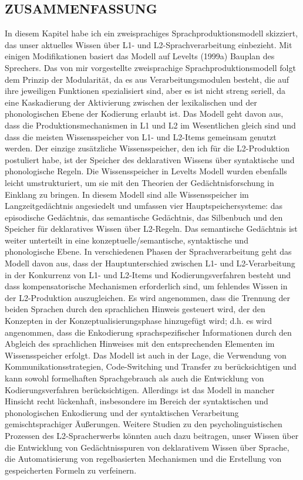 \documentclass[
  letterpaper,
]{scrbook}
\begin{document}
\hypertarget{zusammenfassung}{%
\subsection{ZUSAMMENFASSUNG}\label{zusammenfassung}}

In diesem Kapitel habe ich ein zweisprachiges Sprachproduktionsmodell
skizziert, das unser aktuelles Wissen über L1- und L2-Sprachverarbeitung
einbezieht. Mit einigen Modifikationen basiert das Modell auf Levelts
(1999a) Bauplan des Sprechers. Das von mir vorgestellte zweisprachige
Sprachproduktionsmodell folgt dem Prinzip der Modularität, da es aus
Verarbeitungsmodulen besteht, die auf ihre jeweiligen Funktionen
spezialisiert sind, aber es ist nicht streng seriell, da eine
Kaskadierung der Aktivierung zwischen der lexikalischen und der
phonologischen Ebene der Kodierung erlaubt ist. Das Modell geht davon
aus, dass die Produktionsmechanismen in L1 und L2 im Wesentlichen gleich
sind und dass die meisten Wissensspeicher von L1- und L2-Items gemeinsam
genutzt werden. Der einzige zusätzliche Wissensspeicher, den ich für die
L2-Produktion postuliert habe, ist der Speicher des deklarativen Wissens
über syntaktische und phonologische Regeln. Die Wissensspeicher in
Levelts Modell wurden ebenfalls leicht umstrukturiert, um sie mit den
Theorien der Gedächtnisforschung in Einklang zu bringen. In diesem
Modell sind alle Wissensspeicher im Langzeitgedächtnis angesiedelt und
umfassen vier Hauptspeichersysteme: das episodische Gedächtnis, das
semantische Gedächtnis, das Silbenbuch und den Speicher für deklaratives
Wissen über L2-Regeln. Das semantische Gedächtnis ist weiter unterteilt
in eine konzeptuelle/semantische, syntaktische und phonologische Ebene.
In verschiedenen Phasen der Sprachverarbeitung geht das Modell davon
aus, dass der Hauptunterschied zwischen L1- und L2-Verarbeitung in der
Konkurrenz von L1- und L2-Items und Kodierungsverfahren besteht und dass
kompensatorische Mechanismen erforderlich sind, um fehlendes Wissen in
der L2-Produktion auszugleichen. Es wird angenommen, dass die Trennung
der beiden Sprachen durch den sprachlichen Hinweis gesteuert wird, der
den Konzepten in der Konzeptualisierungsphase hinzugefügt wird; d.h. es
wird angenommen, dass die Enkodierung sprachspezifischer Informationen
durch den Abgleich des sprachlichen Hinweises mit den entsprechenden
Elementen im Wissensspeicher erfolgt. Das Modell ist auch in der Lage,
die Verwendung von Kommunikationsstrategien, Code-Switching und Transfer
zu berücksichtigen und kann sowohl formelhaften Sprachgebrauch als auch
die Entwicklung von Kodierungsverfahren berücksichtigen. Allerdings ist
das Modell in mancher Hinsicht recht lückenhaft, insbesondere im Bereich
der syntaktischen und phonologischen Enkodierung und der syntaktischen
Verarbeitung gemischtsprachiger Äußerungen. Weitere Studien zu den
psycholinguistischen Prozessen des L2-Spracherwerbs könnten auch dazu
beitragen, unser Wissen über die Entwicklung von Gedächtnisspuren von
deklarativem Wissen über Sprache, die Automatisierung von regelbasierten
Mechanismen und die Erstellung von gespeicherten Formeln zu verfeinern.
\end{document}
